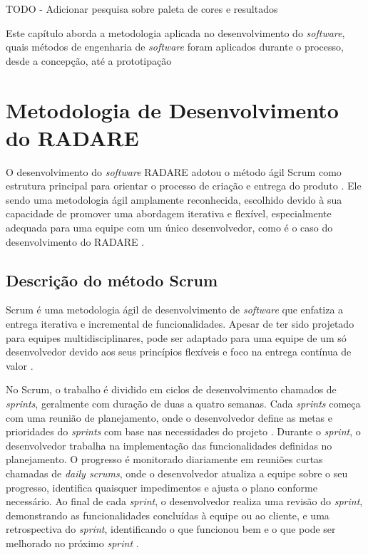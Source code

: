 TODO
- Adicionar pesquisa sobre paleta de cores e resultados

\label{Cap:Metodologia}

Este capítulo aborda a metodologia aplicada no desenvolvimento do \textit{software}, quais métodos de engenharia de \textit{software} foram aplicados durante o processo, desde a concepção, até a prototipação

\section{Metodologia de Desenvolvimento do RADARE}

O desenvolvimento do \textit{software} RADARE adotou o método ágil Scrum como estrutura principal para orientar o processo de criação e entrega do produto \cite{softwareengreq}. Ele sendo uma metodologia ágil amplamente reconhecida, escolhido devido à sua capacidade de promover uma abordagem iterativa e flexível, especialmente adequada para uma equipe com um único desenvolvedor, como é o caso do desenvolvimento do RADARE \cite{scrum}.

\subsection{Descrição do método Scrum}

Scrum é uma metodologia ágil de desenvolvimento de \textit{software} que enfatiza a entrega iterativa e incremental de funcionalidades. Apesar de ter sido projetado para equipes multidisciplinares, pode ser adaptado para uma equipe de um só desenvolvedor devido aos seus princípios flexíveis e foco na entrega contínua de valor \cite{scrumlove}.
        
No Scrum, o trabalho é dividido em ciclos de desenvolvimento chamados de \textit{sprints}, geralmente com duração de duas a quatro semanas. Cada \textit{sprints} começa com uma reunião de planejamento, onde o desenvolvedor define as metas e prioridades do \textit{sprints} com base nas necessidades do projeto \cite{scrummic}. Durante o \textit{sprint}, o desenvolvedor trabalha na implementação das funcionalidades definidas no planejamento. O progresso é monitorado diariamente em reuniões curtas chamadas de \textit{daily scrums}, onde o desenvolvedor atualiza a equipe sobre o seu progresso, identifica quaisquer impedimentos e ajusta o plano conforme necessário. Ao final de cada \textit{sprint}, o desenvolvedor realiza uma revisão do \textit{sprint}, demonstrando as funcionalidades concluídas à equipe ou ao cliente, e uma retrospectiva do \textit{sprint}, identificando o que funcionou bem e o que pode ser melhorado no próximo \textit{sprint} \cite{scrumproj}.
        
